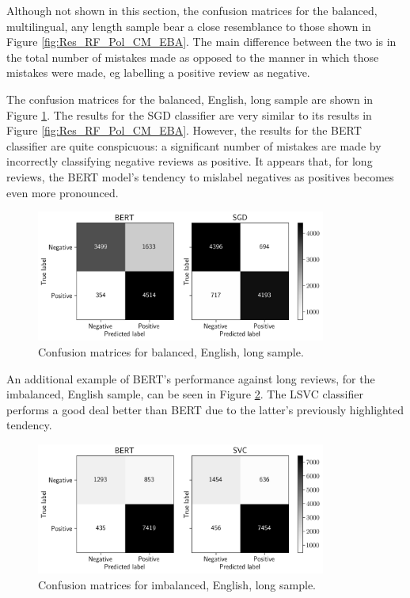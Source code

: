 Although not shown in this section, the confusion matrices for the balanced, multilingual, any length sample bear a close resemblance to those shown in Figure \ref{fig:Res_RF_Pol_CM_EBA}. The main difference between the two is in the total number of mistakes made as opposed to the manner in which those mistakes were made, eg labelling a positive review as negative.

The confusion matrices for the balanced, English, long sample are shown in Figure \ref{fig:Res_RF_Pol_CM_EBL}. The results for the SGD classifier are very similar to its results in Figure \ref{fig:Res_RF_Pol_CM_EBA}. However, the results for the BERT classifier are quite conspicuous: a significant number of mistakes are made by incorrectly classifying negative reviews as positive. It appears that, for long reviews, the BERT model's tendency to mislabel negatives as positives becomes even more pronounced.

\begin{figure}[ht]
    \centering
    \includegraphics[width=0.85\textwidth]{figures/06_results/01_rfp/01_pol/01_cm/eng_eq_long.png}
    \caption{Confusion matrices for balanced, English, long sample.}
    \label{fig:Res_RF_Pol_CM_EBL}
\end{figure}

An additional example of BERT's performance against long reviews, for the imbalanced, English sample, can be seen in Figure \ref{fig:Res_RF_Pol_CM_EIL}. The LSVC classifier performs a good deal better than BERT due to the latter's previously highlighted tendency.

\begin{figure}[ht]
    \centering
    \includegraphics[width=0.85\textwidth]{figures/06_results/01_rfp/01_pol/01_cm/eng_any_long.png}
    \caption{Confusion matrices for imbalanced, English, long sample.}
    \label{fig:Res_RF_Pol_CM_EIL}
\end{figure}

